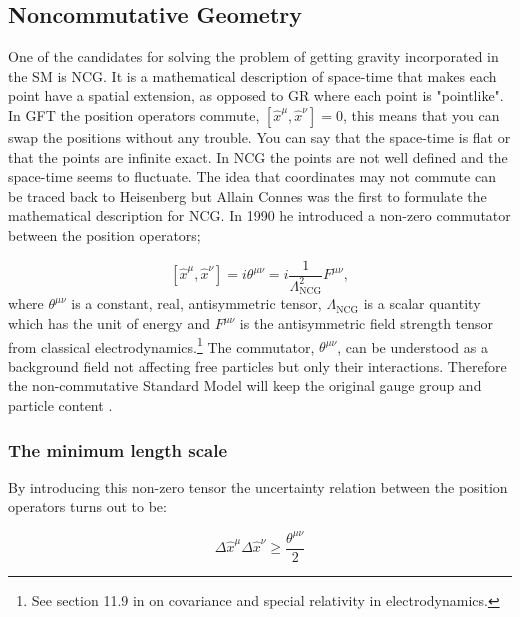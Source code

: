 \subsection{Noncommutative Geometry}
One of the candidates for solving the problem of getting gravity incorporated in the SM is NCG. It is a mathematical description of space-time that makes each point have a spatial extension, as opposed to GR where each point is "pointlike". In GFT the position operators commute, $[ \hat x^{\mu}, \hat x^{\nu}] = 0$, this means that you can swap the positions without any trouble. You can say that the space-time is flat or that the points are infinite exact. In NCG the points are not well defined and the space-time seems to fluctuate. The idea that coordinates may not commute can be traced back to Heisenberg \cite{snyder1947qst} but Allain Connes \cite{connes1991pma} was the first to formulate the mathematical description for NCG. In 1990 he introduced a non-zero commutator between the position operators; \cite{rosendahl2008} 

\begin{equation} \label{eq:ncgtheta}
	[ \hat x^{\mu}, \hat x^{\nu}] = i \theta^{\mu \nu} = i \frac{1}{\Lambda_{\textrm{NCG}}^2} F^{\mu\nu},
\end{equation}
where $\theta^{\mu \nu}$ is a constant, real, antisymmetric tensor, $\Lambda_{\textrm{NCG}}$ is a scalar quantity which has the unit of energy and $F^{\mu\nu}$ is the antisymmetric field strength tensor from classical electrodynamics.\footnote{See section 11.9 in \cite{jackson1975cew} on covariance and special relativity in electrodynamics.} The commutator, $\theta^{\mu \nu}$, can be understood as a background field not affecting free particles but only their interactions. Therefore the non-commutative Standard Model will keep the original gauge group and particle content \cite{rosendahl2008}.

\subsubsection{The minimum length scale}
By introducing this non-zero tensor the uncertainty relation between the position operators turns out to be:

\begin{equation}
\Delta \hat x^{\mu} \Delta \hat x^{\nu} \ge \frac{\theta^{\mu \nu}}{2}
\end{equation}

